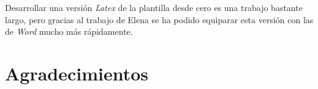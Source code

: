\documentclass[11pt]{report}
\renewcommand{\chaptermark}[1]{\markboth{\scriptsize\MakeUppercase{#1}}{}}
\renewcommand{\sectionmark}[1]{\markright{\tiny\MakeUppercase{#1}}{}}
\renewcommand{\footrulewidth}{0.4pt}
\begin{document}
Desarrollar una versión \textit{Latex} de la plantilla desde cero es una trabajo bastante largo, pero gracias al trabajo de Elena se ha podido equiparar esta versión con las de \textit{Word} mucho más rápidamente.

\thispagestyle{empty}
\chapter*{Agradecimientos}


\pagestyle{fancy}
\renewcommand{\chaptermark}[1]{\markboth{\scriptsize\MakeUppercase{#1}}{}}
\renewcommand{\sectionmark}[1]{\markright{\tiny\MakeUppercase{#1}}{}}


\fancyfoot{}
\fancyfoot[R] {\thepage}
\renewcommand{\footrulewidth}{0.4pt}


\thispagestyle{empty}


\setcounter{tocdepth}{2}
\setcounter{secnumdepth}{4}
\pagestyle{empty}
{
  \renewcommand{\thispagestyle}[1]{}
  \tableofcontents
}
\clearpage


\newpage
{
  \renewcommand{\thispagestyle}[1]{}
  \listoffigures
}
\clearpage

\newpage
{
  \renewcommand{\thispagestyle}[1]{}
  \listoftables
}
\clearpage


%

%





%





\newpage
\nocite{*} %
 

\newpage
\end{document}
